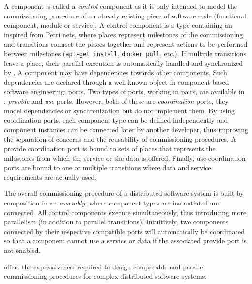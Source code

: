 A \mad component is called a \emph{control} component as it is only intended to model the commissioning procedure of an already existing piece of software code (functional component, module or service). A \mad control component is a type containing an \net inspired from Petri nets, where places represent milestones of the commissioning, and transitions connect the places together and represent actions to be performed between milestones (\eg \texttt{apt-get install}, \texttt{docker pull}, etc.). If multiple transitions leave a place, their parallel execution is automatically handled and synchronized by \mad. A component may have dependencies towards other components. Such dependencies are declared through a well-known object in component-based software engineering: ports. Two types of ports, working in pairs, are available in \mad: \emph{provide} and \emph{use} ports. However, both of these are \emph{coordination} ports, \ie they model dependencies or synchronization but do not implement them. By using coordination ports, each component type can be defined independently and component instances can be connected later by another developer, thus improving the separation of concerns and the reusability of commissioning procedures. A provide coordination port is bound to sets of places that represents the milestones from which the service or the data is offered. Finally, use coordination ports are bound to one or multiple transitions where data and service requirements are actually used.

The overall commissioning procedure of a distributed software system
is built by composition in an \emph{assembly}, where component
types are instantiated and connected. All control components execute
simultaneously, thus introducing more parallelism (in addition to
parallel transitions). Intuitively, two components connected by their
respective compatible ports will automatically be coordinated so
that a component cannot use a service or data if the associated
provide port is not enabled.

\mad offers the expressiveness required to design composable and parallel
commissioning procedures for complex distributed software systems.

